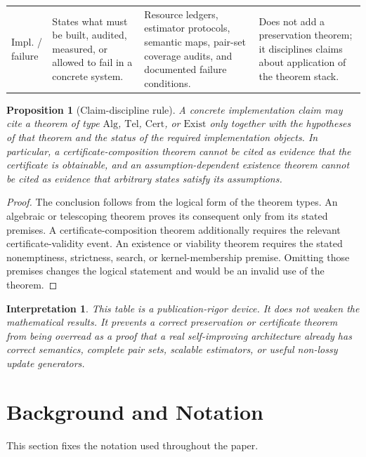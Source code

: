 \documentclass[11pt]{article}
\newtheorem{proposition}[theorem]{Proposition}
\newtheorem{interpretation}[theorem]{Interpretation}
\newcommand{\1}{\mathbf{1}}
\begin{document}
\begin{longtable}{@{}>{\raggedright\arraybackslash}p{}>{\raggedright\arraybackslash}p{}>{\raggedright\arraybackslash}p{}>{\raggedright\arraybackslash}p{}@{}}
\midrule
Impl. / failure & States what must be built, audited, measured, or allowed to fail in a concrete system. & Resource ledgers, estimator protocols, semantic maps, pair-set coverage audits, and documented failure conditions. & Does not add a preservation theorem; it disciplines claims about application of the theorem stack.\\
\end{longtable}

\begin{proposition}[Claim-discipline rule]
\label{prop:claim_discipline_rule}
A concrete implementation claim may cite a theorem of type \(\mathrm{Alg}\), \(\mathrm{Tel}\), \(\mathrm{Cert}\), or \(\mathrm{Exist}\) only together with the hypotheses of that theorem and the status of the required implementation objects. In particular, a certificate-composition theorem cannot be cited as evidence that the certificate is obtainable, and an assumption-dependent existence theorem cannot be cited as evidence that arbitrary states satisfy its assumptions.
\end{proposition}

\begin{proof}
The conclusion follows from the logical form of the theorem types. An algebraic or telescoping theorem proves its consequent only from its stated premises. A certificate-composition theorem additionally requires the relevant certificate-validity event. An existence or viability theorem requires the stated nonemptiness, strictness, search, or kernel-membership premise. Omitting those premises changes the logical statement and would be an invalid use of the theorem.
\end{proof}

\begin{interpretation}
This table is a publication-rigor device. It does not weaken the mathematical results. It prevents a correct preservation or certificate theorem from being overread as a proof that a real self-improving architecture already has correct semantics, complete pair sets, scalable estimators, or useful non-lossy update generators.
\end{interpretation}

\section{Background and Notation}

This section fixes the notation used throughout the paper.
\end{document}
